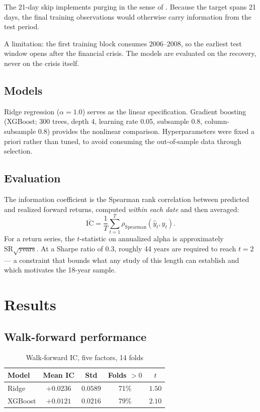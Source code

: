 \documentclass[11pt]{article}
\begin{document}
The 21-day skip implements purging in the sense of \citet{lopezdeprado2018}.
Because the target spans 21 days, the final training observations would
otherwise carry information from the test period.

A limitation: the first training block consumes 2006--2008, so the earliest test
window opens after the financial crisis. The models are evaluated on the
recovery, never on the crisis itself.

\subsection{Models}

Ridge regression ($\alpha = 1.0$) serves as the linear specification. Gradient
boosting (XGBoost; 300 trees, depth 4, learning rate 0.05, subsample 0.8,
column-subsample 0.8) provides the nonlinear comparison. Hyperparameters were
fixed a priori rather than tuned, to avoid consuming the out-of-sample data
through selection.

\subsection{Evaluation}

The information coefficient is the Spearman rank correlation between predicted
and realized forward returns, computed \emph{within each date} and then averaged:
\[
\overline{\mathrm{IC}} = \frac{1}{T}\sum_{t=1}^{T}
\rho_{\text{Spearman}}\!\left(\hat{y}_{t}, y_{t}\right).
\]
For a return series, the $t$-statistic on annualized alpha is approximately
$\mathrm{SR}\sqrt{\text{years}}$. At a Sharpe ratio of $0.3$, roughly 44 years
are required to reach $t=2$ --- a constraint that bounds what any study of this
length can establish and which motivates the 18-year sample.

\section{Results}

\subsection{Walk-forward performance}

\begin{table}[H]
\centering
\caption{Walk-forward IC, five factors, 14 folds}
\begin{tabular}{lcccc}
\toprule
\textbf{Model} & \textbf{Mean IC} & \textbf{Std} & \textbf{Folds $>0$} & \textbf{$t$} \\
\midrule
Ridge   & $+0.0236$ & $0.0589$ & 71\% & $1.50$ \\
XGBoost & $+0.0121$ & $0.0216$ & 79\% & $2.10$ \\
\bottomrule
\end{tabular}
\end{table}
\end{document}
